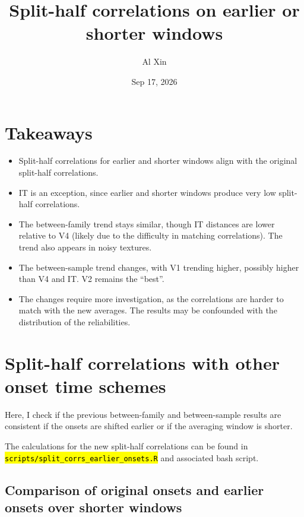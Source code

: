 \documentclass[
  10pt,
  letterpaper,
  DIV=11,
  numbers=noendperiod]{scrartcl}
\title{Split-half correlations on earlier or shorter windows}
\author{Al Xin}
\date{Sep 17, 2026}
\providecommand{\tightlist}{%
  \setlength{\itemsep}{0pt}\setlength{\parskip}{0pt}}
\let\OldTexttt\texttt
\renewcommand{\texttt}[1]{\OldTexttt{\hl{#1}}}
\begin{document}
\maketitle


\section{Takeaways}\label{takeaways}

\begin{itemize}
\tightlist
\item
  Split-half correlations for earlier and shorter windows align with the
  original split-half correlations.
\item
  IT is an exception, since earlier and shorter windows produce very low
  split-half correlations.
\item
  The between-family trend stays similar, though IT distances are lower
  relative to V4 (likely due to the difficulty in matching
  correlations). The trend also appears in noisy textures.
\item
  The between-sample trend changes, with V1 trending higher, possibly
  higher than V4 and IT. V2 remains the ``best''.
\item
  The changes require more investigation, as the correlations are harder
  to match with the new averages. The results may be confounded with the
  distribution of the reliabilities.
\end{itemize}

\section{Split-half correlations with other onset time
schemes}\label{split-half-correlations-with-other-onset-time-schemes}

Here, I check if the previous between-family and between-sample results
are consistent if the onsets are shifted earlier or if the averaging
window is shorter.

The calculations for the new split-half correlations can be found in
\texttt{scripts/split\_corrs\_earlier\_onsets.R} and associated bash
script.

\subsection{Comparison of original onsets and earlier onsets over
shorter
windows}\label{comparison-of-original-onsets-and-earlier-onsets-over-shorter-windows}
\end{document}
